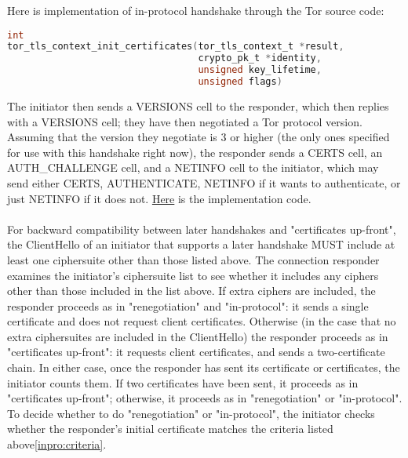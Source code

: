 Here is implementation of in-protocol handshake through the Tor source code:

\begin{lstlisting}[language=c, caption={\href{https://gitweb.torproject.org/tor.git/tree/src/lib/tls/tortls.c}{in-protocol implementation} line number 287 }]
int
tor_tls_context_init_certificates(tor_tls_context_t *result,
                                  crypto_pk_t *identity,
                                  unsigned key_lifetime,
                                  unsigned flags)
\end{lstlisting}
  

The initiator then sends a VERSIONS cell to the responder, which then replies with a VERSIONS cell; they have then negotiated a Tor protocol version.  Assuming that the version they negotiate is 3 or higher (the only ones specified for use with this handshake right now), the responder sends a CERTS cell, an AUTH\_CHALLENGE cell, and a NETINFO cell to the initiator, which may send either CERTS, AUTHENTICATE, NETINFO if it wants to authenticate, or just NETINFO if it does not.
\href{tor/src/core/or/channeltls.c}{Here} is the implementation code.
\paragraph{}
For backward compatibility between later handshakes and "certificates up-front", the ClientHello of an initiator that supports a later handshake MUST include at least one ciphersuite other than those listed above. The connection responder examines the initiator's ciphersuite list to see whether it includes any ciphers other than those included in the list above.  If extra ciphers are included, the responder proceeds as in "renegotiation" and "in-protocol": it sends a single certificate and does not request client certificates.  Otherwise (in the case that no extra ciphersuites are included in the ClientHello) the responder proceeds as in "certificates up-front": it requests client certificates, and sends a two-certificate chain.  In either case, once the responder has sent its certificate or certificates, the initiator counts them. If two certificates have been sent, it proceeds as in "certificates up-front"; otherwise, it proceeds as in "renegotiation" or "in-protocol".
\\
To decide whether to do "renegotiation" or "in-protocol", the initiator checks whether the responder's initial certificate matches the criteria listed above\ref{inpro:criteria}.

